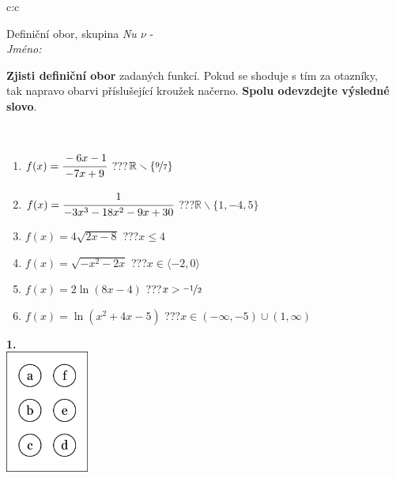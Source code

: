 \documentclass[10pt]{report}
\begin{document}
\begin{tabular}{c:c}
\begin{minipage}[c][104.5mm][t]{0.5\linewidth}
\begin{center}
\vspace{7mm}
{\huge Definiční obor, skupina \textit{Nu $\nu$} -}\\[5mm]
\textit{Jméno:}\phantom{xxxxxxxxxxxxxxxxxxxxxxxxxxxxxxxxxxxxxxxxxxxxxxxxxxxxxxxxxxxxxxxxx}\\[5mm]
\begin{minipage}{0.95\linewidth}
\begin{center}
\textbf{Zjisti definiční obor} zadaných funkcí. Pokud se shoduje s tím za otazníky,\\tak napravo obarvi příslušející kroužek načerno. \textbf{Spolu odevzdejte výsledné slovo}.
\end{center}
\end{minipage}
\\[1mm]
\begin{minipage}{0.79\linewidth}
\begin{center}
\begin{varwidth}{\linewidth}
\begin{enumerate}
\normalsizerrr
\item $f(x)=\cfrac{-6x-1}{-7x+9}$\quad \dotfill\; ???\;\dotfill \quad $\mathbb{R}\smallsetminus\{\nicefrac{9}{7}\}$
\item $f(x)=\cfrac{1}{-3x^3-18x^2-9x+30}$\quad \dotfill\; ???\;\dotfill \quad $\mathbb{R}\smallsetminus\{1,-4,5\}$
\item $f(x)=4\sqrt{2x-8}$\quad \dotfill\; ???\;\dotfill \quad $x\leq4$
\item $f(x)=\sqrt{-x^2-2x}$\quad \dotfill\; ???\;\dotfill \quad $x\in\langle-2 , 0\rangle$
\item $f(x)=2\ln{(8x-4)}$\quad \dotfill\; ???\;\dotfill \quad $x>\nicefrac{-1}{2}$
\item $f(x)=\ln{(x^2+4x-5)}$\quad \dotfill\; ???\;\dotfill \quad $x\in(-\infty , -5)\cup(1 , \infty)$
\end{enumerate}
\end{varwidth}
\end{center}
\end{minipage}
\begin{minipage}{0.20\linewidth}
\begin{center}
{\Huge\bfseries 1.} \\[2mm]
\includegraphics[height=40mm]{../images/braille.png}

\end{center}
\end{minipage}
\end{center}
\end{minipage}
\end{tabular}
\end{document}
